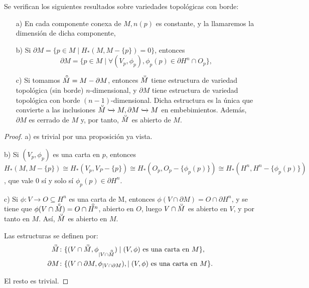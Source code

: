 \begin{proposition}[Consecuencias]
  Se verifican los siguientes resultados sobre variedades topológicas con borde:
  \begin{itemize}
    \item[a)] En cada componente conexa de $M, n(p)$ es constante, y la llamaremos la dimensión de dicha componente,

    \item[b)] Si $\partial M = \{p \in M \mid H_*(M, M - \{p\}) = 0\}$, entonces
    \[ \partial M = \{p \in M \mid \forall (V_p, \phi_p), \phi_p(p) \in \partial H^n \cap O_p\}, \]

    \item[c)] Si tomamos $\interior{M} = M - \partial M$, entonces $\interior{M}$ tiene estructura de variedad topológica
    (sin borde) $n$-dimensional, y $\partial M$ tiene estructura de variedad topológica con borde $(n-1)$-dimensional.
    Dicha estructura es la única que convierte a las inclusiones $\interior{M} \xhookrightarrow{} M, \partial M \xhookrightarrow{} M$
    en embebimientos. Además, $\partial M$ es cerrado de $M$ y, por tanto, $\interior{M}$ es abierto de $M$.
  \end{itemize}
\end{proposition}

\begin{proof}
  a) es trivial por una proposición ya vista.

  b) Si $(V_p, \phi_p)$ es una carta en $p$, entonces
  $H_*(M, M - \{p\}) \cong H_*(V_p, V_P - \{p\}) \cong H_*(O_p, O_p - \{\phi_p(p)\}) \cong H_*(H^n, H^n - \{\phi_p(p)\})$,
  que vale $0$ sí y solo sí $\phi_p(p) \in \partial H^n$.

  c) Si $\phi \colon V \to O \subseteq H^n$ es una carta de M, entonces $\phi(V \cap \partial M) = O \cap \partial H^n$, y se tiene que
  $\phi(V \cap \interior{M}) = O \cap \interior{H^n}$, abierto en $O$, luego $V \cap \interior{M}$ es abierto en $V$, y por tanto en $M$.
  Así, $\interior{M}$ es abierto en $M$.

  Las estructuras se definen por:
  \begin{align*}
    \interior{M} &\colon \{(V \cap \interior{M}, \phi_{|V \cap \interior{M}}) \mid (V, \phi) \text{ es una carta en }M\}, \\
    \partial M &\colon   \{(V \cap \partial M,  \phi_{|V \cap \partial M}), \mid (V, \phi) \text{ es una carta en }M\}.
  \end{align*}

  El resto es trivial.
\end{proof}

